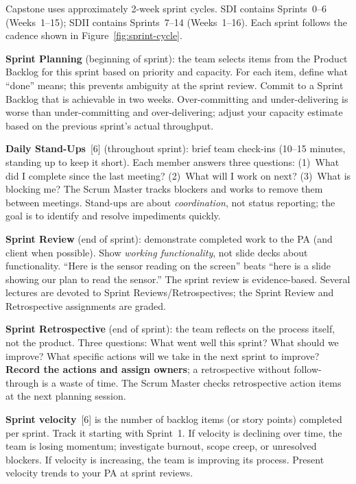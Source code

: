 Capstone uses approximately 2-week sprint cycles. SDI contains Sprints~0--6 (Weeks~1--15); SDII contains Sprints~7--14 (Weeks~1--16). Each sprint follows the cadence shown in Figure~\ref{fig:sprint-cycle}.

\textbf{Sprint Planning} (beginning of sprint): the team selects items from the Product Backlog for this sprint based on priority and capacity. For each item, define what ``done'' means; this prevents ambiguity at the sprint review. Commit to a Sprint Backlog that is achievable in two weeks. Over-committing and under-delivering is worse than under-committing and over-delivering; adjust your capacity estimate based on the previous sprint's actual throughput.

\textbf{Daily Stand-Ups}~[6] (throughout sprint): brief team check-ins (10--15 minutes, standing up to keep it short). Each member answers three questions: (1)~What did I complete since the last meeting? (2)~What will I work on next? (3)~What is blocking me? The Scrum Master tracks blockers and works to remove them between meetings. Stand-ups are about \emph{coordination}, not status reporting; the goal is to identify and resolve impediments quickly.

\textbf{Sprint Review} (end of sprint): demonstrate completed work to the PA (and client when possible). Show \emph{working functionality}, not slide decks about functionality. ``Here is the sensor reading on the screen'' beats ``here is a slide showing our plan to read the sensor.'' The sprint review is evidence-based. Several lectures are devoted to Sprint Reviews/Retrospectives; the Sprint Review and Retrospective assignments are graded.

\textbf{Sprint Retrospective} (end of sprint): the team reflects on the process itself, not the product. Three questions: What went well this sprint? What should we improve? What specific actions will we take in the next sprint to improve? \textbf{Record the actions and assign owners}; a retrospective without follow-through is a waste of time. The Scrum Master checks retrospective action items at the next planning session.

\begin{tipbox}
\textbf{Sprint velocity}~[6] is the number of backlog items (or story points) completed per sprint. Track it starting with Sprint~1. If velocity is declining over time, the team is losing momentum; investigate burnout, scope creep, or unresolved blockers. If velocity is increasing, the team is improving its process. Present velocity trends to your PA at sprint reviews.
\end{tipbox}


